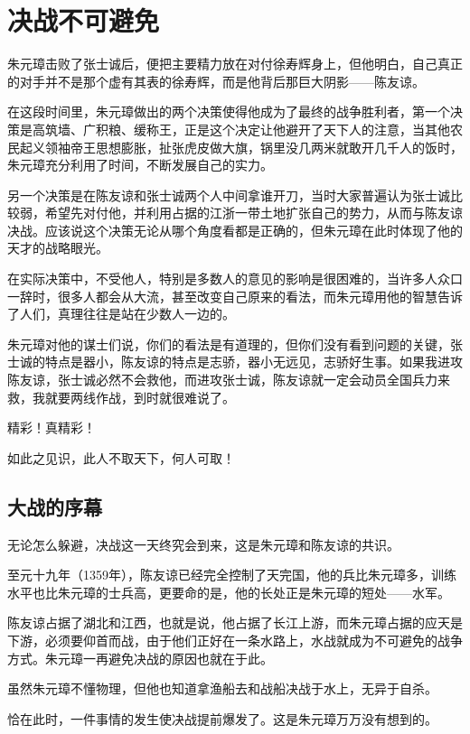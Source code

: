 \section{决战不可避免}
\ifnum{}
	\begin{multicols}{\theparacolNo}
		\fi
		朱元璋击败了张士诚后，便把主要精力放在对付徐寿辉身上，但他明白，自己真正的对手并不是那个虚有其表的徐寿辉，而是他背后那巨大阴影——陈友谅。

		在这段时间里，朱元璋做出的两个决策使得他成为了最终的战争胜利者，第一个决策是高筑墙、广积粮、缓称王，正是这个决定让他避开了天下人的注意，当其他农民起义领袖帝王思想膨胀，扯张虎皮做大旗，锅里没几两米就敢开几千人的饭时，朱元璋充分利用了时间，不断发展自己的实力。

		另一个决策是在陈友谅和张士诚两个人中间拿谁开刀，当时大家普遍认为张士诚比较弱，希望先对付他，并利用占据的江浙一带土地扩张自己的势力，从而与陈友谅决战。应该说这个决策无论从哪个角度看都是正确的，但朱元璋在此时体现了他的天才的战略眼光。

		在实际决策中，不受他人，特别是多数人的意见的影响是很困难的，当许多人众口一辞时，很多人都会从大流，甚至改变自己原来的看法，而朱元璋用他的智慧告诉了人们，真理往往是站在少数人一边的。

		朱元璋对他的谋士们说，你们的看法是有道理的，但你们没有看到问题的关键，张士诚的特点是器小，陈友谅的特点是志骄，器小无远见，志骄好生事。如果我进攻陈友谅，张士诚必然不会救他，而进攻张士诚，陈友谅就一定会动员全国兵力来救，我就要两线作战，到时就很难说了。

		精彩！真精彩！

		如此之见识，此人不取天下，何人可取！

		\subsection{大战的序幕}
		无论怎么躲避，决战这一天终究会到来，这是朱元璋和陈友谅的共识。

		至元十九年（1359年），陈友谅已经完全控制了天完国，他的兵比朱元璋多，训练水平也比朱元璋的士兵高，更要命的是，他的长处正是朱元璋的短处——水军。

		陈友谅占据了湖北和江西，也就是说，他占据了长江上游，而朱元璋占据的应天是下游，必须要仰首而战，由于他们正好在一条水路上，水战就成为不可避免的战争方式。朱元璋一再避免决战的原因也就在于此。

		虽然朱元璋不懂物理，但他也知道拿渔船去和战船决战于水上，无异于自杀。

		恰在此时，一件事情的发生使决战提前爆发了。这是朱元璋万万没有想到的。


\end{multicols}
